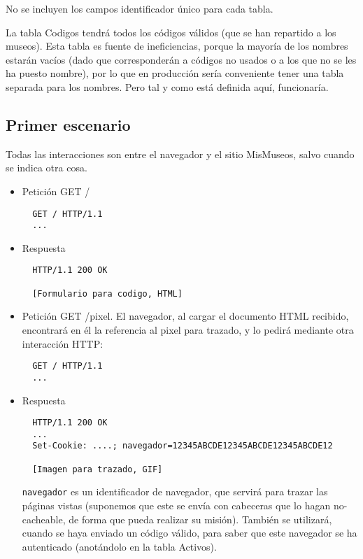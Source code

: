 {No se incluyen los campos identificador único para cada tabla.

La tabla Codigos tendrá todos los códigos válidos (que se han repartido a los museos). Esta tabla es fuente de ineficiencias, porque la mayoría de los nombres estarán vacíos (dado que corresponderán a códigos no usados o a los que no se les ha puesto nombre), por lo que en producción sería conveniente tener una tabla separada para los nombres. Pero tal y como está definida aquí, funcionaría.

\subsection*{Primer escenario}

Todas las interacciones son entre el navegador y el sitio MisMuseos, salvo cuando se indica otra cosa.

\begin{itemize}
\item Petición GET /

\begin{verbatim}
  GET / HTTP/1.1
  ...
\end{verbatim}

\item Respuesta

\begin{verbatim}
  HTTP/1.1 200 OK

  [Formulario para codigo, HTML]
\end{verbatim}

\item Petición GET /pixel. El navegador, al cargar el documento HTML recibido, encontrará en él la referencia al pixel para trazado, y lo pedirá mediante otra interacción HTTP:

\begin{verbatim}
  GET / HTTP/1.1
  ...
\end{verbatim}

\item Respuesta

\begin{verbatim}
  HTTP/1.1 200 OK
  ...
  Set-Cookie: ....; navegador=12345ABCDE12345ABCDE12345ABCDE12

  [Imagen para trazado, GIF]
\end{verbatim}

\verb|navegador| es un identificador de navegador, que servirá para trazar las páginas vistas (suponemos que este se envía con cabeceras que lo hagan no-cacheable, de forma que pueda realizar su misión). También se utilizará, cuando se haya enviado un código válido, para saber que este navegador se ha autenticado (anotándolo en la tabla Activos).


\end{itemize}}
